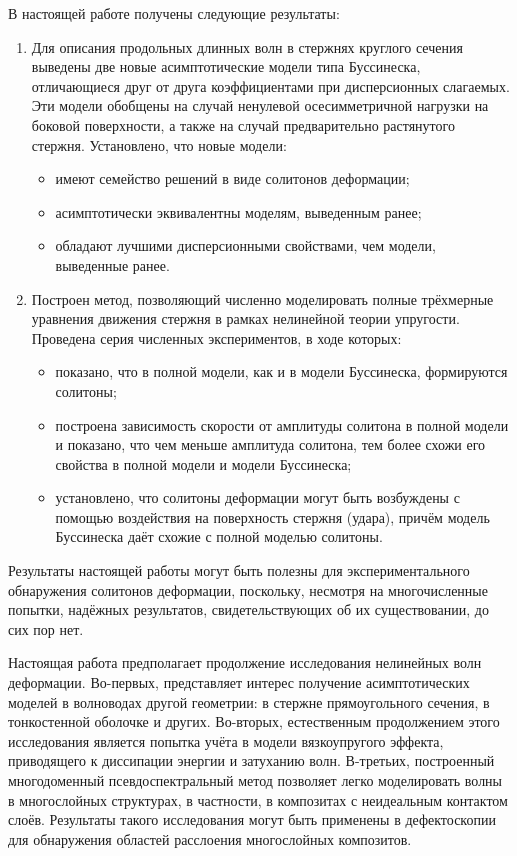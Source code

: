 \documentclass[12pt, a4paper]{report}
\begin{document}
В настоящей работе получены следующие результаты:
\begin{enumerate}
	\item Для описания продольных длинных волн в стержнях круглого сечения выведены две новые асимптотические модели типа Буссинеска, отличающиеся друг от друга коэффициентами при дисперсионных слагаемых. Эти модели обобщены на случай ненулевой осесимметричной нагрузки на боковой поверхности, а также на случай предварительно растянутого стержня. Установлено, что новые модели:
	\begin{itemize}[noitemsep,topsep=1pt]
		\item имеют семейство решений в виде солитонов деформации;
		\item асимптотически эквивалентны моделям, выведенным ранее;
		\item обладают лучшими дисперсионными свойствами, чем модели, выведенные ранее.
	\end{itemize}

	\item Построен метод, позволяющий численно моделировать полные трёхмерные уравнения движения стержня в рамках нелинейной теории упругости. Проведена серия численных экспериментов, в ходе которых:
	\begin{itemize}[noitemsep,topsep=1pt]
		\item показано, что в полной модели, как и в модели Буссинеска, формируются солитоны;
		\item построена зависимость скорости от амплитуды солитона в полной модели и показано, что чем меньше амплитуда солитона, тем более схожи его свойства в полной модели и модели Буссинеска;
		\item установлено, что солитоны деформации могут быть возбуждены с помощью воздействия на поверхность стержня (удара), причём модель Буссинеска даёт схожие с полной моделью солитоны.
	\end{itemize}
\end{enumerate}

Результаты настоящей работы могут быть полезны для экспериментального обнаружения солитонов деформации, поскольку, несмотря на многочисленные попытки, надёжных результатов, свидетельствующих об их существовании, до сих пор нет.

Настоящая работа предполагает продолжение исследования нелинейных волн деформации. Во-первых, представляет интерес получение асимптотических моделей в волноводах другой геометрии: в стержне прямоугольного сечения, в тонкостенной оболочке и других. Во-вторых, естественным продолжением этого исследования является попытка учёта в модели вязкоупругого эффекта, приводящего к диссипации энергии и затуханию волн. В-третьих, построенный многодоменный псевдоспектральный метод позволяет легко моделировать волны в многослойных структурах, в частности, в композитах с неидеальным контактом слоёв. Результаты такого исследования могут быть применены в дефектоскопии для обнаружения областей расслоения многослойных композитов.
\end{document}
